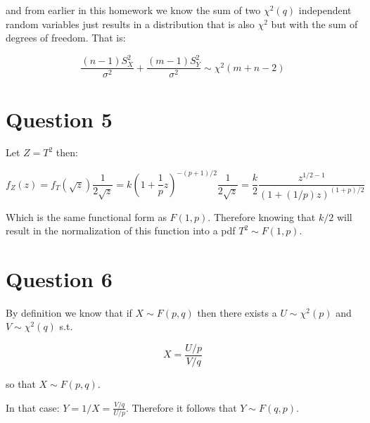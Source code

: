 \documentclass[11pt]{article}
\begin{document}
and from earlier in this homework we know the sum of two $\chi^2(q)$ independent random variables just results in a distribution that is also $\chi^2$ but with the sum of degrees of freedom. That is:

$$\frac{(n-1)S_X^2}{\sigma^2} + \frac{(m-1)S_Y^2}{\sigma^2} \sim \chi^2(m + n - 2)$$


\section*{Question 5}

Let $Z=T^2$ then:

$$f_Z(z) = f_T(\sqrt{z})\frac{1}{2\sqrt{z}}=k\left(1+\frac{1}{p}z\right)^{-(p+1)/2}\frac{1}{2\sqrt{z}}=\frac{k}{2}\frac{z^{1/2-1}}{(1+(1/p)z)^{(1+p)/2}}$$

Which is the same functional form as $F(1,p)$. Therefore knowing that $k/2$ will result in the normalization of this function into a pdf $T^2\sim F(1,p)$. 

\section*{Question 6}

By definition we know that if $X\sim F(p, q)$ then there exists a $U\sim \chi^2 (p)$ and $V\sim \chi^2 (q)$ s.t.

$$X=\frac{U/p}{V/q}$$

so that $X\sim F(p,q)$. \newline

In that case: $Y=1/X=\frac{V/q}{U/p}$. Therefore it follows that $Y\sim F(q,p)$. 
\end{document}
